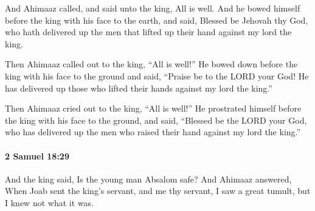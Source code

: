 			\begin{versebox}
					\item[BHS] 
					\item[ASV] And Ahimaaz called, and said unto the king, All is well. And he bowed himself before the king with his face to the earth, and said, Blessed be Jehovah thy God, who hath delivered up the men that lifted up their hand against my lord the king.
					\item[NIV] Then Ahimaaz called out to the king, “All is well!” He bowed down before the king with his face to the ground and said, “Praise be to the LORD your God! He has delivered up those who lifted their hands against my lord the king.”
					\item[NRSV] Then Ahimaaz cried out to the king, “All is well!” He prostrated himself before the king with his face to the ground, and said, “Blessed be the LORD your God, who has delivered up the men who raised their hand against my lord the king.”
			\end{versebox}

		\paragraph{2 Samuel 18:29} %
			\label{2SAMUEL-18-29}

			And the king said, Is the young man Absalom safe? And Ahimaaz answered, When Joab sent the king’s servant, and me thy servant, I saw a great tumult, but I knew not what it was.

